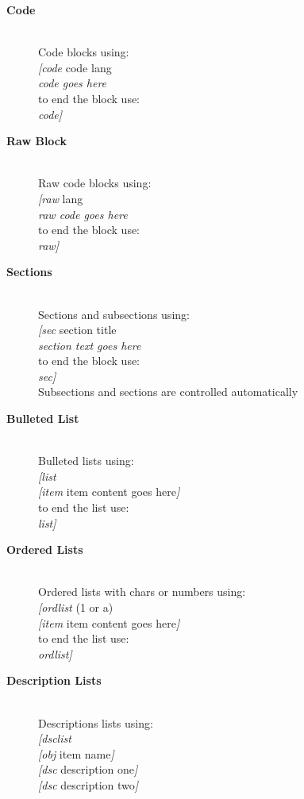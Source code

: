 \documentclass{article}
\begin{document}
\begin{description}
\item[\textbf{Code}]\\
Code blocks using:\\
\textit{[code} code lang\\
\textit{code goes here}\\
to end the block use:\\
\textit{code]}
\item[\textbf{Raw Block}]\\
Raw code blocks using:\\
\textit{[raw} lang\\
\textit{raw code goes here}\\
to end the block use:\\
\textit{raw]}
\item[\textbf{Sections}]\\
Sections and subsections using:\\
\textit{[sec} section title\\
\textit{section text goes here}\\
to end the block use:\\
\textit{sec]}\\
Subsections and sections are controlled automatically
\item[\textbf{Bulleted List}]\\
Bulleted lists using:\\
\textit{[list}\\
\textit{[item} item content goes here\textit{]}\\
to end the list use:\\
\textit{list]}
\item[\textbf{Ordered Lists}]\\
Ordered lists with chars or numbers using:\\
\textit{[ordlist} (1 or a)\\
\textit{[item} item content goes here\textit{]}\\
to end the list use:\\
\textit{ordlist]}
\item[\textbf{Description Lists}]\\
Descriptions lists using:\\
\textit{[dsclist}\\
\textit{[obj} item name\textit{]}\\
\textit{[dsc} description one\textit{]}\\
\textit{[dsc} description two\textit{]}\\

\end{description}
\end{document}
